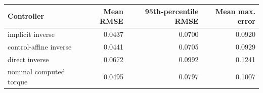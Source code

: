 \begin{tabular}{lrrr}
\toprule
Controller & Mean RMSE & 95th-percentile RMSE & Mean max. error \\
\midrule
implicit inverse & 0.0437 & 0.0700 & 0.0920 \\
control-affine inverse & 0.0441 & 0.0705 & 0.0929 \\
direct inverse & 0.0672 & 0.0992 & 0.1241 \\
nominal computed torque & 0.0495 & 0.0797 & 0.1007 \\
\bottomrule
\end{tabular}
